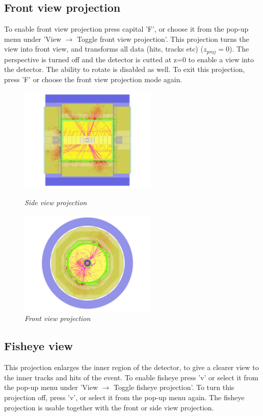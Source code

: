 \documentclass[a4paper,10pt]{article}
\begin{document}
\subsection{Front view projection}
To enable front view projection press capital 'F', or choose it from the pop-up menu under 'View $\rightarrow$ Toggle front view projection'. This projection turns the view into front view, and transforms all data (hits, tracks etc)
($z_{proj} = 0$). The perspective is turned off and the detector is cutted at z=0 to enable a view into the detector. The ability to rotate is disabled as well. To exit this projection, press 'F' or choose the front view projection mode again. 

\begin{figure}[h!]
\begin{minipage}[t]{6cm}
\centerline{\includegraphics[height=5cm]{sideview2.png}}
\caption{\label{CEDViewer} \textsl{Side view projection}}
\end{minipage}
\hfill
\begin{minipage}[t]{6cm}
\setlength{\fboxsep}{0mm}
\centerline{\includegraphics[height=5cm]{frontview2.png}}
\caption{\label{DSTViewer}\textsl{Front view projection}}
\end{minipage}
\end{figure}

\subsection{Fisheye view}
This projection enlarges the inner region of the detector, to give a clearer view to the inner tracks and hits of the event. To enable fisheye press 'v' or select it from the pop-up menu under 'View $\rightarrow$ Toggle fisheye projection'. To turn this projection off, press 'v', or select it from the pop-up menu again. The fisheye projection is usable together with the front or side view projection.
\end{document}
